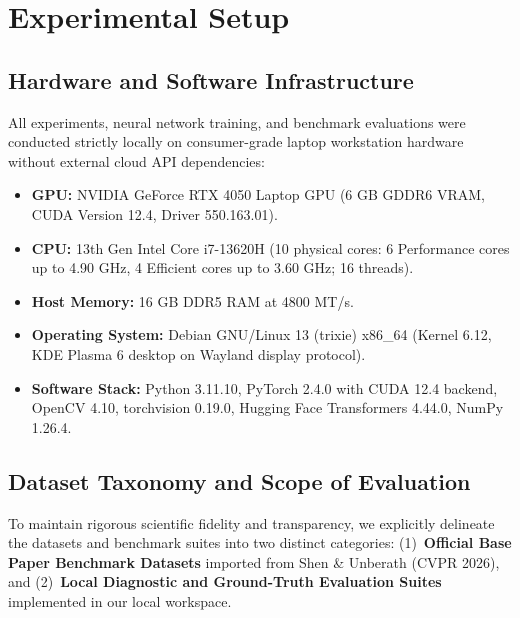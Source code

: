 \documentclass[10pt,twocolumn,letterpaper]{article}
\begin{document}
\section{Experimental Setup}
\label{sec:setup}

\subsection{Hardware and Software Infrastructure}
All experiments, neural network training, and benchmark evaluations were conducted strictly locally on consumer-grade laptop workstation hardware without external cloud API dependencies:
\begin{itemize}[leftmargin=*,itemsep=1pt,topsep=1pt]
    \item \textbf{GPU:} NVIDIA GeForce RTX 4050 Laptop GPU (6 GB GDDR6 VRAM, CUDA Version 12.4, Driver 550.163.01).
    \item \textbf{CPU:} 13th Gen Intel Core i7-13620H (10 physical cores: 6 Performance cores up to 4.90 GHz, 4 Efficient cores up to 3.60 GHz; 16 threads).
    \item \textbf{Host Memory:} 16 GB DDR5 RAM at 4800 MT/s.
    \item \textbf{Operating System:} Debian GNU/Linux 13 (trixie) x86\_64 (Kernel 6.12, KDE Plasma 6 desktop on Wayland display protocol).
    \item \textbf{Software Stack:} Python 3.11.10, PyTorch 2.4.0 with CUDA 12.4 backend, OpenCV 4.10, torchvision 0.19.0, Hugging Face Transformers 4.44.0, NumPy 1.26.4.
\end{itemize}

\subsection{Dataset Taxonomy and Scope of Evaluation}
To maintain rigorous scientific fidelity and transparency, we explicitly delineate the datasets and benchmark suites into two distinct categories: (1)~\textbf{Official Base Paper Benchmark Datasets} imported from Shen \& Unberath (CVPR 2026), and (2)~\textbf{Local Diagnostic and Ground-Truth Evaluation Suites} implemented in our local workspace.
\end{document}
